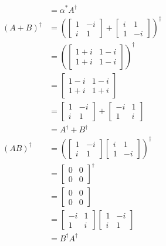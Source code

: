 \documentclass[main.tex]{subfiles}
\begin{document}
\begin{enumerate}
\begin{align*}
                                            & = \alpha^{*} A^{\dagger} \\
        (A+B)^{\dagger}                     & = \left( \left[\begin{array}{cc}1 & -i \\ i & 1\end{array}\right] + \left[\begin{array}{cc}i & 1 \\ 1 & -i\end{array}\right] \right)^{\dagger}\\
                                            & = \left( \left[\begin{array}{cc} 1+i & 1-i \\ 1+i & 1-i\end{array}\right] \right)^{\dagger}\\
                                            & = \left[\begin{array}{cc} 1-i & 1-i \\ 1+i & 1+i\end{array}\right]\\
                                            & = \left[\begin{array}{cc} 1 & -i \\ i & 1\end{array}\right] + \left[\begin{array}{cc}-i & 1 \\ 1 & i\end{array}\right]\\
                                            & = A^{\dagger}+B^{\dagger}\\
        (A B)^{\dagger}                     & = \left( \left[\begin{array}{cc}1 & -i \\ i & 1\end{array}\right] \left[\begin{array}{cc}i & 1 \\ 1 & -i\end{array}\right] \right)^{\dagger}\\
                                            & = \left[\begin{array}{cc} 0 & 0 \\ 0 & 0\end{array}\right]^{\dagger}\\
                                            & = \left[\begin{array}{cc} 0 & 0 \\ 0 & 0\end{array}\right]\\
                                            & = \left[\begin{array}{cc} -i & 1 \\ 1 & i\end{array}\right] \left[\begin{array}{cc} 1 & -i \\ i & 1\end{array}\right]\\
                                            & = B^{\dagger} A^{\dagger}
    \end{align*}


\end{enumerate}
\end{document}
